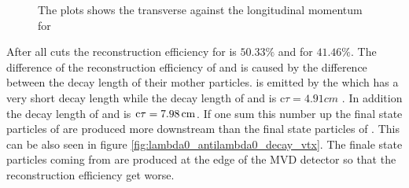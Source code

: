 		\begin{figure}
			
			\caption{\propose The plots shows the transverse against the longitudinal momentum for \lam}
			\label{fig:lambda0_pt_vs_pz}
		
		\end{figure}
		After all cuts the reconstruction efficiency for \lam is $50.33\%$ and for \alam $41.46\%$.
		The difference of the reconstruction efficiency of \lam and \alam is caused by the difference between the decay length of their mother particles.
		\lam is emitted by the \excitedcascade which has a very short decay length while the decay length of \cascade and \anticascade is c$\tau = 4.91 \unit{cm}$ \cite{PDG}.
		In addition the decay length of \lam and \alam is $\textnormal{c}\tau = 7.98 \, \textnormal{cm}$.
		If one sum this number up the final state particles of \alam are produced more downstream than the final state particles of \lam.
		This can be also seen in figure \ref{fig:lambda0_antilambda0_decay_vtx}.
		The finale state particles coming from \alam are produced at the edge of the MVD detector so that the reconstruction efficiency get worse.
		
